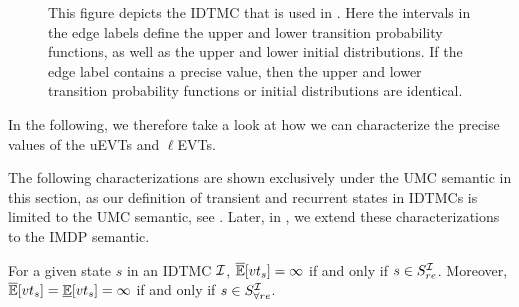 \begin{figure}[h]
\centering
{}
\caption{This figure depicts the IDTMC that is used in . Here the intervals in the edge labels define the upper and lower transition probability functions, as well as the upper and lower initial distributions. If the edge label contains a precise value, then the upper and lower transition probability functions or initial distributions are identical.}
\label{fig:tightness_of_bounds_evts}
\end{figure}

In the following, we therefore take a look at how we can characterize the precise values of the uEVTs and $\ell$EVTs.

The following characterizations are shown exclusively under the UMC semantic in this section, as our definition of transient and recurrent states in IDTMCs is limited to the UMC semantic, see . Later, in , we extend these characterizations to the IMDP semantic.
\begin{theorem}\label{th:Expupper_ExpLower_infty}
    For a given state $s$ in an IDTMC $\mathcal{I}$, $\mathbb{\overline{E}}[vt_s] = \infty$ if and only if $s\in S_{re}^{\mathcal{I}}$.
    Moreover, $\mathbb{\overline{E}}[vt_s] = \mathbb{\underline{E}}[vt_s] = \infty$ if and only if $s\in S^{\mathcal{I}}_{\forall re}$.
\end{theorem}

